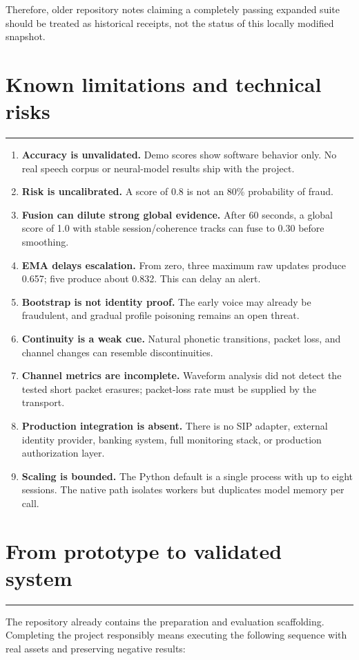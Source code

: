 \documentclass[10pt,a4paper]{article}
\newcommand{\sectionrule}{\vspace{-2mm}\textcolor{blue}{\rule{22mm}{1.2pt}}\vspace{2mm}}
\begin{document}
Therefore, older repository notes claiming a completely passing expanded suite should be treated as historical receipts, not the status of this locally modified snapshot.

\section{Known limitations and technical risks}
\sectionrule

\begin{enumerate}
\item \textbf{Accuracy is unvalidated.} Demo scores show software behavior only. No real speech corpus or neural-model results ship with the project.
\item \textbf{Risk is uncalibrated.} A score of 0.8 is not an 80\% probability of fraud.
\item \textbf{Fusion can dilute strong global evidence.} After 60 seconds, a global score of 1.0 with stable session/coherence tracks can fuse to 0.30 before smoothing.
\item \textbf{EMA delays escalation.} From zero, three maximum raw updates produce 0.657; five produce about 0.832. This can delay an alert.
\item \textbf{Bootstrap is not identity proof.} The early voice may already be fraudulent, and gradual profile poisoning remains an open threat.
\item \textbf{Continuity is a weak cue.} Natural phonetic transitions, packet loss, and channel changes can resemble discontinuities.
\item \textbf{Channel metrics are incomplete.} Waveform analysis did not detect the tested short packet erasures; packet-loss rate must be supplied by the transport.
\item \textbf{Production integration is absent.} There is no SIP adapter, external identity provider, banking system, full monitoring stack, or production authorization layer.
\item \textbf{Scaling is bounded.} The Python default is a single process with up to eight sessions. The native path isolates workers but duplicates model memory per call.
\end{enumerate}

\section{From prototype to validated system}
\sectionrule

The repository already contains the preparation and evaluation scaffolding. Completing the project responsibly means executing the following sequence with real assets and preserving negative results:
\end{document}
